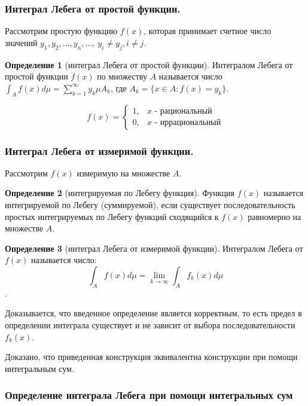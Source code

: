 \documentclass[14pt,a4paper]{extarticle}
\theoremstyle{definition}
\newtheorem{definition}{Определение}[section]
\theoremstyle{remark}
\renewcommand{\[}{\begin{dmath*}[compact]}
\renewcommand{\]}{\end{dmath*}}
\newcommand{\ds}{\displaystyle}
\newcommand{\sep}{ , \ \allowbreak }
\begin{document}
\subsubsection{Интеграл Лебега от простой функции.}

Рассмотрим простую функцию $f(x)$, которая принимает
счетное число значений
$y_1, y_2, \dots, y_n, \dots \sep y_i \neq y_j, i \neq j$.

\begin{definition}[интеграл Лебега от простой функции]
  Интегралом Лебега от простой функции $f(x)$ по множеству $A$
  называется число $\ds\int_A f(x) d\mu = \sum_{k=1}^\infty y_k\mu A_k$,
  где $A_k=\{x\in A:f(x)=y_k\}$.
\end{definition}

\[f(x) = \begin{cases}
  1, & x\text{ - рациональный} \\
  0, & x\text{ - иррациональный}
\end{cases}\]

\subsubsection{Интеграл Лебега от измеримой функции.}

Рассмотрим $f(x)$ измеримую на множестве $A$.

\begin{definition}[интегрируемая по Лебегу функция]
  Функция $f(x)$ называется интегрируемой по Лебегу (суммируемой),
  если существует последовательность простых интегрируемых по Лебегу функций
  сходящийся к $f(x)$ равномерно на множестве $A$.
\end{definition}

\begin{definition}[интеграл Лебега от измеримой функции]
  Интегралом Лебега от $f(x)$ называется число:
  \[\int_A f(x) d\mu = \lim_{k \to \infty} \int_A f_k(x) d\mu\].
\end{definition}

Доказывается, что введенное определение является корректным,
то есть предел в определении интеграла существует и не зависит
от выбора последовательности $f_k(x)$.

Доказано, что приведенная конструкция эквивалентна конструкции
при помощи интегральным сум.

\subsubsection{Определение интеграла Лебега при помощи интегральных сум}
\end{document}
